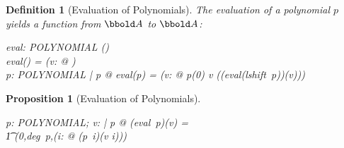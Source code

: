 \documentclass[12pt]{scrartcl}
\newtheorem{prop}{Proposition}[section]
\newtheorem{zdef}{Definition}[section]
\begin{document}
\begin{zdef}[Evaluation of Polynomials]
  \label{zdef:evaluation}
  The evaluation of a polynomial $p$ yields a function from $\arithmos$ to
  $\arithmos$:
  \begin{axdef}
    eval: POLYNOMIAL \fun (\arithmos \fun \arithmos)\\
    \where
    eval(\zeropol) = (\lambda v: \arithmos @ \azero)\\
    \forall p: POLYNOMIAL | p \neq \zeropol @ eval(p) = (\lambda v:
    \arithmos @ p(0) \aplus v \amult ((eval(lshift~p))(v)))
  \end{axdef}
\end{zdef}


\begin{prop}[Evaluation of Polynomials]
  \label{prop:evalutation}
  \begin{zed}
    \forall p: POLYNOMIAL; v: \arithmos | p \neq \zeropol @ (eval~p)(v) = \\
    \t1 \finsum(0,deg~p,(\lambda i: \nat @ (p~i)\amult(v \apwr i)))
  \end{zed}
\end{prop}
\end{document}

